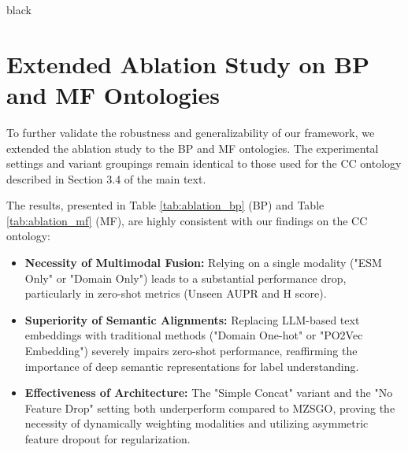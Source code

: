 \documentclass{article}
\begin{document}
\newpage
\begin{color}{black}
\section{Extended Ablation Study on BP and MF Ontologies}
\label{supp:ablation_bp_mf}

To further validate the robustness and generalizability of our framework, we extended the ablation study to the BP and MF ontologies. The experimental settings and variant groupings remain identical to those used for the CC ontology described in Section 3.4 of the main text.

The results, presented in Table \ref{tab:ablation_bp} (BP) and Table \ref{tab:ablation_mf} (MF), are highly consistent with our findings on the CC ontology:
\begin{itemize}
    \item \textbf{Necessity of Multimodal Fusion:} Relying on a single modality ("ESM Only" or "Domain Only") leads to a substantial performance drop, particularly in zero-shot metrics (Unseen AUPR and H score).
    \item \textbf{Superiority of Semantic Alignments:} Replacing LLM-based text embeddings with traditional methods ("Domain One-hot" or "PO2Vec Embedding") severely impairs zero-shot performance, reaffirming the importance of deep semantic representations for label understanding.
    \item \textbf{Effectiveness of Architecture:} The "Simple Concat" variant and the "No Feature Drop" setting both underperform compared to MZSGO, proving the necessity of dynamically weighting modalities and utilizing asymmetric feature dropout for regularization.
\end{itemize}


\end{color}
\end{document}
